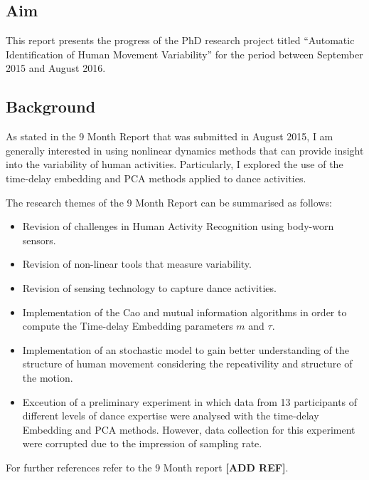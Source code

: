 \documentclass[10pt,journal,onecolumn,compsoc]{IEEEtran}
\begin{document}

\subsection{Aim}

This report presents the progress of the PhD research project titled
``Automatic Identification of Human Movement Variability'' 
for the period between September 2015 and August 2016.

\subsection{Background}
As stated in the 9 Month Report that was submitted in August 2015,
I am generally interested in using nonlinear dynamics methods 
that can provide insight into the variability of human activities.
Particularly, I explored the use of the time-delay embedding and PCA methods
applied to dance activities. 

The research themes of the 9 Month Report can be summarised as follows:

\begin{itemize}
 \item Revision of challenges in Human Activity Recognition using body-worn sensors.
 \item Revision of non-linear tools that measure variability.
 \item Revision of sensing technology to capture dance activities.
 \item Implementation of the Cao and mutual information algorithms in order 
    to compute the Time-delay Embedding parameters $m$ and $\tau$.
 \item Implementation of an stochastic model to gain better understanding of the 
 structure of human movement considering the repeativility and structure of the motion.
 \item Exceution of a preliminary experiment in which data from 13 participants of different 
 levels of dance expertise were analysed with the time-delay Embedding and PCA methods.
 However, data collection for this experiment were corrupted due to the impression of sampling rate.
\end{itemize}

For further references refer to the 9 Month report \textbf{[ADD REF]}.
\end{document}
